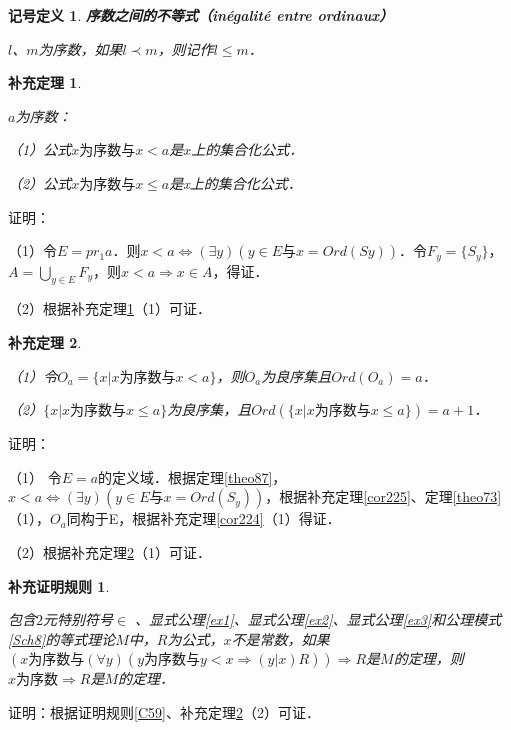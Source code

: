 \documentclass[12pt, a4paper, oneside]{book}
\newtheorem{sign}{记号定义}
\newtheorem{Ccor}{补充证明规则}
\newtheorem{cor}{补充定理}
\begin{document}
			\begin{sign}
				\textbf{序数之间的不等式（inégalité entre ordinaux）}
				\par
				$l$、$m$为序数，如果$l\prec m$，则记作$l\leq m$．
			\end{sign}
			
			\begin{cor}\label{cor252}
				\hfill\par
				$a$为序数：
				\par
				（1）公式$x\text{为序数}\text{与}x<a$是$x$上的集合化公式．
				\par
				（2）公式$x\text{为序数}\text{与}x\leq a$是x上的集合化公式．
			\end{cor}
			证明：
			\par
			（1）令$E=pr_1a$．则$x<a\Leftrightarrow (\exists y)(y\in E\text{与}x=Ord(Sy))$．令$F_y=\{S_y\}$，$A=\bigcup\limits_{y\in E}F_y$，则$x<a\Rightarrow x\in A$，得证．
			\par
			（2）根据补充定理\ref{cor252}（1）可证．
			
			\begin{cor}\label{cor253}
				\hfill\par
				（1）令$O_a=\{x|x\text{为序数}\text{与}x<a\}$，则$O_a$为良序集且$Ord(O_a)=a$． 
				\par
				（2）$\{x|x\text{为序数}\text{与}x\leq a\}$为良序集，且$Ord(\{x|x\text{为序数}\text{与}x\leq a\})=a+1$．
			\end{cor}
			证明：
			\par
			（1）	令$E=a\text{的定义域}$．根据定理\ref{theo87}，$x<a\Leftrightarrow (\exists y)(y\in E\text{与}x=Ord(S_y))$，根据补充定理\ref{cor225}、定理\ref{theo73}（1），$O_a$同构于E，根据补充定理\ref{cor224}（1）得证．
			\par
			（2）根据补充定理\ref{cor253}（1）可证．
						
			\begin{Ccor}\label{Ccor86}
				\hfill\par
				包含$2$元特别符号$\in$ 、显式公理\ref{ex1}、显式公理\ref{ex2}、显式公理\ref{ex3}和公理模式\ref{Sch8}的等式理论$M$中，$R$为公式，$x$不是常数，如果$(x\text{为序数}\text{与}(\forall y)(y\text{为序数}\text{与}y<x\Rightarrow (y|x)R))\Rightarrow R$是$M$的定理，则$x\text{为序数}\Rightarrow R$是$M$的定理．
			\end{Ccor}
			证明：根据证明规则\ref{C59}、补充定理\ref{cor253}（2）可证．
			
\end{document}

